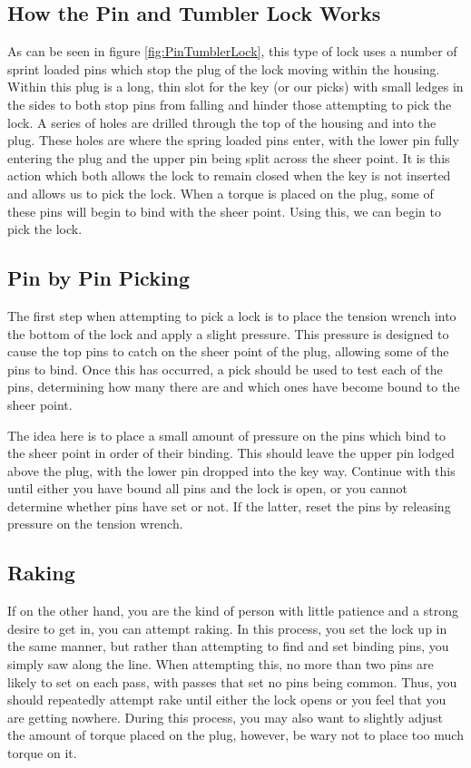 		\subsection{How the Pin and Tumbler Lock Works}
			As can be seen in figure \ref{fig:PinTumblerLock}, this type of lock uses a number of sprint loaded pins which stop the plug of the lock moving within the housing.
			Within this plug is a long, thin slot for the key (or our picks) with small ledges in the sides to both stop pins from falling and hinder those attempting to pick the lock.
			A series of holes are drilled through the top of the housing and into the plug.
			These holes are where the spring loaded pins enter, with the lower pin fully entering the plug and the upper pin being split across the sheer point.
			It is this action which both allows the lock to remain closed when the key is not inserted and allows us to pick the lock.
			When a torque is placed on the plug, some of these pins will begin to bind with the sheer point.
			Using this, we can begin to pick the lock.

		\subsection{Pin by Pin Picking}
			The first step when attempting to pick a lock is to place the tension wrench into the bottom of the lock and apply a slight pressure.
			This pressure is designed to cause the top pins to catch on the sheer point of the plug, allowing some of the pins to bind.
			Once this has occurred, a pick should be used to test each of the pins, determining how many there are and which ones have become bound to the sheer point.

			The idea here is to place a small amount of pressure on the pins which bind to the sheer point in order of their binding.
			This should leave the upper pin lodged above the plug, with the lower pin dropped into the key way.
			Continue with this until either you have bound all pins and the lock is open, or you cannot determine whether pins have set or not.
			If the latter, reset the pins by releasing pressure on the tension wrench.
		\subsection{Raking}
			If on the other hand, you are the kind of person with little patience and a strong desire to get in, you can attempt raking.
			In this process, you set the lock up in the same manner, but rather than attempting to find and set binding pins, you simply saw along the line.
			When attempting this, no more than two pins are likely to set on each pass, with passes that set no pins being common.
			Thus, you should repeatedly attempt rake until either the lock opens or you feel that you are getting nowhere.
			During this process, you may also want to slightly adjust the amount of torque placed on the plug, however, be wary not to place too much torque on it.

